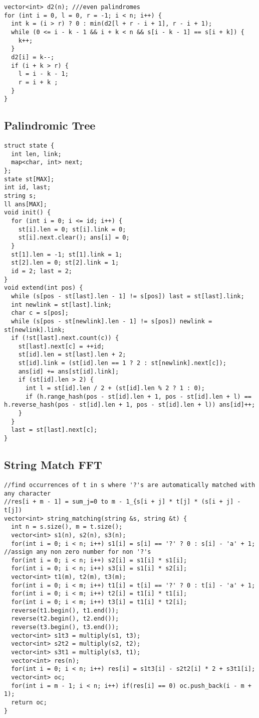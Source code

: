 \documentclass[10pt,a4paper,onesided]{article}
\begin{document}
\begin{multicols*}{3}
\begin{lstlisting}
vector<int> d2(n); ///even palindromes
for (int i = 0, l = 0, r = -1; i < n; i++) {
  int k = (i > r) ? 0 : min(d2[l + r - i + 1], r - i + 1);
  while (0 <= i - k - 1 && i + k < n && s[i - k - 1] == s[i + k]) {
    k++;
  }
  d2[i] = k--;
  if (i + k > r) {
    l = i - k - 1;
    r = i + k ;
  }
}\end{lstlisting}
\subsection{Palindromic Tree}
\begin{lstlisting}
struct state {
  int len, link;
  map<char, int> next;
};
state st[MAX];
int id, last;
string s;
ll ans[MAX];
void init() {
  for (int i = 0; i <= id; i++) {
    st[i].len = 0; st[i].link = 0;
    st[i].next.clear(); ans[i] = 0;
  }
  st[1].len = -1; st[1].link = 1;
  st[2].len = 0; st[2].link = 1;
  id = 2; last = 2;
}
void extend(int pos) {
  while (s[pos - st[last].len - 1] != s[pos]) last = st[last].link;
  int newlink = st[last].link;
  char c = s[pos];
  while (s[pos - st[newlink].len - 1] != s[pos]) newlink = st[newlink].link;
  if (!st[last].next.count(c)) {
    st[last].next[c] = ++id;
    st[id].len = st[last].len + 2;
    st[id].link = (st[id].len == 1 ? 2 : st[newlink].next[c]);
    ans[id] += ans[st[id].link];
    if (st[id].len > 2) {
      int l = st[id].len / 2 + (st[id].len % 2 ? 1 : 0);
      if (h.range_hash(pos - st[id].len + 1, pos - st[id].len + l) == h.reverse_hash(pos - st[id].len + 1, pos - st[id].len + l)) ans[id]++;
    }
  }
  last = st[last].next[c];
}
\end{lstlisting}
\subsection{String Match FFT}
\begin{lstlisting}
//find occurrences of t in s where '?'s are automatically matched with any character
//res[i + m - 1] = sum_j=0 to m - 1_{s[i + j] * t[j] * (s[i + j] - t[j])
vector<int> string_matching(string &s, string &t) {
  int n = s.size(), m = t.size();
  vector<int> s1(n), s2(n), s3(n);
  for(int i = 0; i < n; i++) s1[i] = s[i] == '?' ? 0 : s[i] - 'a' + 1; //assign any non zero number for non '?'s
  for(int i = 0; i < n; i++) s2[i] = s1[i] * s1[i];
  for(int i = 0; i < n; i++) s3[i] = s1[i] * s2[i];
  vector<int> t1(m), t2(m), t3(m);
  for(int i = 0; i < m; i++) t1[i] = t[i] == '?' ? 0 : t[i] - 'a' + 1;
  for(int i = 0; i < m; i++) t2[i] = t1[i] * t1[i];
  for(int i = 0; i < m; i++) t3[i] = t1[i] * t2[i];
  reverse(t1.begin(), t1.end());
  reverse(t2.begin(), t2.end());
  reverse(t3.begin(), t3.end());
  vector<int> s1t3 = multiply(s1, t3);
  vector<int> s2t2 = multiply(s2, t2);
  vector<int> s3t1 = multiply(s3, t1);
  vector<int> res(n);
  for(int i = 0; i < n; i++) res[i] = s1t3[i] - s2t2[i] * 2 + s3t1[i];
  vector<int> oc;
  for(int i = m - 1; i < n; i++) if(res[i] == 0) oc.push_back(i - m + 1);
  return oc;
}
\end{lstlisting}

\end{multicols*}
\end{document}
